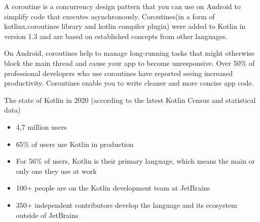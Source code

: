 A coroutine is a concurrency design pattern that you can use on Android to simplify code that executes asynchronously. Coroutines(in a form of kotlinx.coroutines library and kotlin compiler plugin) were added to Kotlin in version 1.3 and are based on established concepts from other languages.

On Android, coroutines help to manage long-running tasks that might otherwise block the main thread and cause your app to become unresponsive. Over 50\% of professional developers who use coroutines have reported seeing increased productivity. Coroutines enable you to write cleaner and more concise app code.

The state of Kotlin in 2020 (according to the latest Kotlin Census and statistical data)
\begin{itemize}
    \item 4,7 million users
    \item 65\% of users use Kotlin in production
    \item For 56\% of users, Kotlin is their primary language, which means the main or only
    one they use at work
    \item 100+ people are on the Kotlin development team at JetBrains
    \item 350+ independent contributors develop the language and its ecosystem outside
    of JetBrains
\end{itemize}

